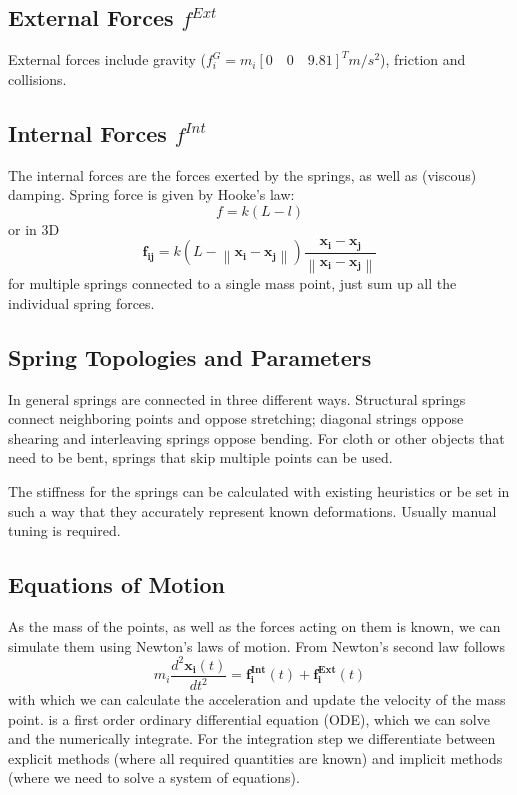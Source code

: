 \documentclass{article}
\newcommand{\norm}[1]{\left\lVert#1\right\rVert}
\begin{document}
\subsection{External Forces $f^{Ext}$}
External forces include gravity ($f^G_i = m_i \left[0\quad0\quad9.81\right]^T m/s^2$), friction and collisions.

\subsection{Internal Forces $f^{Int}$}
The internal forces are the forces exerted by the springs, as well as (viscous) damping.
Spring force is given by Hooke's law:
\begin{equation}
    f = k(L-l)
\end{equation}
or in 3D
\begin{equation}
    \bm{f_{ij}} = k(L-\norm{\bm{x_i} - \bm{x_j}})\frac{\bm{x_i}-\bm{x_j}}{\norm{\bm{x_i}-\bm{x_j}}}
\end{equation}
for multiple springs connected to a single mass point, just sum up all the individual spring forces.

\subsection{Spring Topologies and Parameters}
In general springs are connected in three different ways.
Structural springs connect neighboring points and oppose stretching; diagonal strings oppose shearing and interleaving springs oppose bending.
For cloth or other objects that need to be bent, springs that skip multiple points can be used.

The stiffness for the springs can be calculated with existing heuristics or be set in such a way that they accurately represent known deformations.
Usually manual tuning is required.

\subsection{Equations of Motion}
As the mass of the points, as well as the forces acting on them is known, we can simulate them using Newton's laws of motion.
From Newton's second law follows
\begin{equation}
    \label{eq:acceleration}
    m_i\frac{d^2\bm{x_i}(t)}{dt^2} = \bm{f_i^{Int}}(t) + \bm{f_i^{Ext}}(t)
\end{equation}
with which we can calculate the acceleration and update the velocity of the mass point.
 is a first order ordinary differential equation (ODE), which we can solve and the numerically integrate.
For the integration step we differentiate between explicit methods (where all required quantities are known) and implicit methods (where we need to solve a system of equations).
\end{document}
